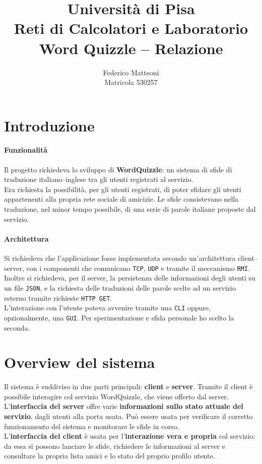\documentclass[10pt]{article}
\begin{document}
{\selectfont
\title{Università di Pisa\\Reti di Calcolatori e Laboratorio\\Word Quizzle -- Relazione}
\author{Federico Matteoni\\Matricola 530257}
\date{ }
\renewcommand*\contentsname{Indice}

\maketitle
\section{Introduzione}
\paragraph{Funzionalità} Il progetto richiedeva lo sviluppo di \textbf{WordQuizzle}: un sistema di sfide di traduzione italiano--inglese tra gli utenti registrati al servizio.\\
Era richiesta la possibilità, per gli utenti registrati, di poter sfidare gli utenti appartenenti alla propria rete sociale di amicizie. Le sfide consistevano nella traduzione, nel minor tempo possibile, di una serie di parole italiane proposte dal servizio.
\paragraph{Architettura} Si richiedeva che l'applicazione fosse implementata secondo un'architettura client--server, con i componenti che comunicano \texttt{TCP}, \texttt{UDP} e tramite il meccanismo \texttt{RMI}. Inoltre si richiedeva, per il server, la persistenza delle informazioni degli utenti su un file \texttt{JSON}, e la richiesta delle traduzioni delle parole scelte ad un servizio esterno tramite richieste \texttt{HTTP GET}.\\
L'interazione con l'utente poteva avvenire tramite una \texttt{CLI} oppure, opzionalmente, una \texttt{GUI}. Per sperimentazione e sfida personale ho scelto la seconda.
\section{Overview del sistema}
Il sistema è suddiviso in due parti principali: \textbf{client} e \textbf{server}. Tramite il client è possibile interagire col servizio WordQuizzle, che viene offerto dal server.\\
L'\textbf{interfaccia del server} offre varie \textbf{informazioni sullo stato attuale del servizio}, dagli utenti alla porta usata. Può essere usata per verificare il corretto funzionamento del sistema e monitorare le sfide in corso.\\
L'\textbf{interfaccia del client} è usata per l'\textbf{interazione vera e propria} col servizio: da essa si possono lanciare le sfide, richiedere le informazioni al server e consultare la propria lista amici e lo stato del proprio profilo utente.
}
\end{document}
